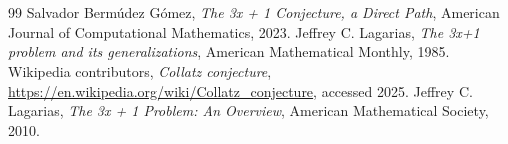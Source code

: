 \documentclass{zc-ust-hw}
\begin{document}
\section*{}

\begin{thebibliography}{99}
   Salvador Bermúdez Gómez, \textit{The 3x + 1 Conjecture, a Direct Path}, American Journal of Computational Mathematics, 2023.
   Jeffrey C. Lagarias, \textit{The 3x+1 problem and its generalizations}, American Mathematical Monthly, 1985.
   Wikipedia contributors, \textit{Collatz conjecture}, \url{https://en.wikipedia.org/wiki/Collatz_conjecture}, accessed 2025.
   Jeffrey C. Lagarias, \textit{The 3x + 1 Problem: An Overview}, American Mathematical Society, 2010.
\end{thebibliography}
\end{document}
